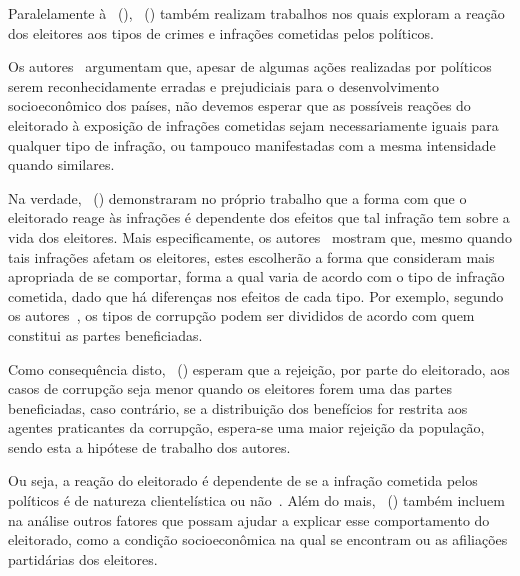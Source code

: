 \documentclass[
	12pt,				%
	openright,			%
	twoside,			%
	a4paper,			%
	openany,
	english,			%
	brazil				%
	]{abntex2}
\begin{document}


Paralelamente à ~(\citeyear{Boas2019Apr}), ~(\citeyear{Botero2021Apr}) também realizam trabalhos nos quais exploram a reação dos eleitores aos tipos de crimes e infrações cometidas pelos políticos.

Os autores~\cite{Botero2021Apr} argumentam que, apesar de algumas ações realizadas por políticos serem reconhecidamente erradas e prejudiciais para o desenvolvimento socioeconômico dos países, não devemos esperar que as possíveis reações do eleitorado à exposição de infrações cometidas sejam necessariamente iguais para qualquer tipo de infração, ou tampouco manifestadas com a mesma intensidade quando similares.

Na verdade, ~(\citeyear{Botero2021Apr}) demonstraram no próprio trabalho que a forma com que o eleitorado reage às infrações é dependente dos efeitos que tal infração tem sobre a vida dos eleitores. Mais especificamente, os autores~\cite{Botero2021Apr} mostram que, mesmo quando tais infrações afetam os eleitores, estes escolherão a forma que consideram mais apropriada de se comportar, forma a qual varia de acordo com o tipo de infração cometida, dado que há diferenças nos efeitos de cada tipo. Por exemplo, segundo os autores~\cite{Botero2021Apr}, os tipos de corrupção podem ser divididos de acordo com quem constitui as partes beneficiadas.

Como consequência disto, ~(\citeyear{Botero2021Apr}) esperam que a rejeição, por parte do eleitorado, aos casos de corrupção seja menor quando os eleitores forem uma das partes beneficiadas, caso contrário, se a distribuição dos benefícios for restrita aos agentes praticantes da corrupção, espera-se uma maior rejeição da população, sendo esta a hipótese de trabalho dos autores.

Ou seja, a reação do eleitorado é dependente de se a infração cometida pelos políticos é de natureza clientelística ou não~\cite{Botero2021Apr}. Além do mais, ~(\citeyear{Botero2021Apr}) também incluem na análise outros fatores que possam ajudar a explicar esse comportamento do eleitorado, como a condição socioeconômica na qual se encontram ou as afiliações partidárias dos eleitores.

\end{document}
